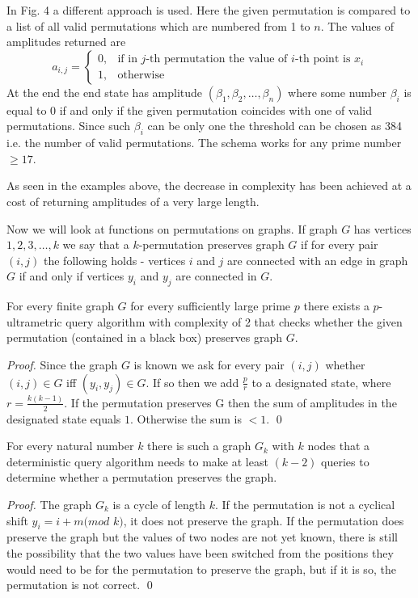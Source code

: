\documentclass{llncs}
\begin{document}
In Fig. 4 a different approach is used. Here the given permutation is compared to a list of all valid permutations which are numbered from 1 to $n$. The values of amplitudes returned are
$$a_{i,j}=\begin{cases}
0, & \text{if in $j$-th permutation the value of $i$-th point is $x_i$} \\
1, & \text{otherwise}
\end{cases}$$
At the end the end state has amplitude $(\beta_1,\beta_2,\dots,\beta_n)$ where some number $\beta_i$ is equal to 0 if and only if the given permutation coincides with one of valid permutations. Since such $\beta_i$ can be only one the threshold can be chosen as 384 i.e. the number of valid permutations. The schema works for any prime number $\geq 17$.

As seen in the examples above, the decrease in complexity has been achieved at a cost of returning amplitudes of a very large length.

Now we will look at functions on permutations on graphs. If graph $G$ has vertices $1,2,3,\dots,k$ we say that a $k$-permutation preserves graph $G$ if for every pair $(i,j)$ the following holds - vertices $i$ and $j$ are connected with an edge in graph $G$ if and only if vertices $y_i$ and $y_j$ are connected in $G$.

\begin{theorem}
For every finite graph $G$ for every sufficiently large prime $p$ there exists a $p$-ultrametric query algorithm with complexity of 2 that checks whether the given permutation (contained in a black box) preserves graph $G$.
\end{theorem}
\begin{proof}
Since the graph $G$ is known we ask for every pair $(i,j)$ whether $(i,j)\in G$ iff $(y_i, y_j)\in G$. If so then we add $\frac{p}{r}$ to a designated state, where $r=\frac{k(k-1)}{2}$. If the permutation preserves G then the sum of amplitudes in the designated state equals $1$. Otherwise the sum is $<1$.
\qed
\end{proof}

\begin{theorem}
For every natural number $k$ there is such a graph $G_k$ with $k$ nodes that a deterministic query algorithm needs to make at least $(k-2)$ queries to determine whether a permutation preserves the graph.
\end{theorem}
\begin{proof}
The graph $G_k$ is a cycle of length $k$. If the permutation is not a cyclical shift $y_i = i+m(mod$ $k)$, it does not preserve the graph. If the permutation does preserve the graph but the values of two nodes are not yet known, there is still the possibility that the two values have been switched from the positions they would need to be for the permutation to preserve the graph, but if it is so, the permutation is not correct.
\qed
\end{proof}
\end{document}
